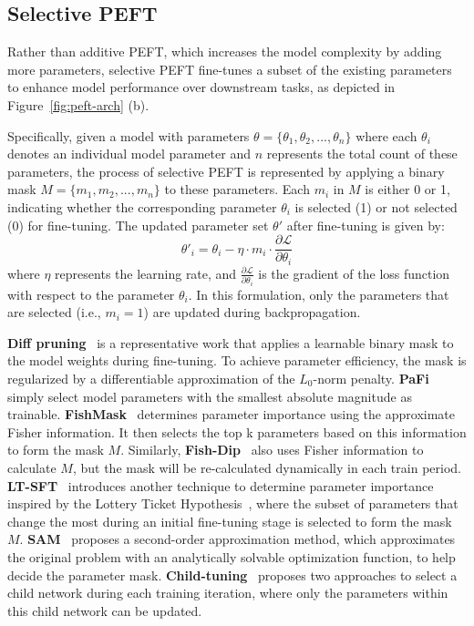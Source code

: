 \subsection{Selective PEFT}
\label{sec:selective}
Rather than additive PEFT, which increases the model complexity by adding more parameters, selective PEFT fine-tunes a subset of the existing parameters to enhance model performance over downstream tasks, as depicted in Figure~\ref{fig:peft-arch} (b).

Specifically, given a model with parameters \(\theta = \{\theta_1, \theta_2, ..., \theta_n\}\) where each \(\theta_i\) denotes an individual model parameter and $n$ represents the total count of these parameters, the process of selective PEFT is represented by applying a binary mask \(M = \{m_1, m_2, ..., m_n\}\) to these parameters. Each \(m_i\) in \(M\) is either 0 or 1, indicating whether the corresponding parameter \(\theta_i\) is selected (1) or not selected (0) for fine-tuning. The updated parameter set \(\theta'\) after fine-tuning is given by:
\begin{equation}
\theta'_i = \theta_i - \eta \cdot m_i \cdot \frac{\partial \mathcal{L}}{\partial \theta_i}
\end{equation}
where \(\eta\) represents the learning rate, and \(\frac{\partial \mathcal{L}}{\partial \theta_i}\) is the gradient of the loss function with respect to the parameter \(\theta_i\). In this formulation, only the parameters that are selected (i.e., \(m_i = 1\)) are updated during backpropagation. 



\textbf{Diff pruning}~\cite{10-diff-purning} is a representative work that applies a learnable binary mask to the model weights during fine-tuning. To achieve parameter efficiency, the mask is regularized by a differentiable approximation of the $L_0$-norm penalty. 
\textbf{PaFi}~\cite{liao2023parameter} simply select model parameters with the smallest absolute magnitude as trainable.
\textbf{FishMask}~\cite{36-fish-masks} determines parameter importance using the approximate Fisher information. It then selects the top k parameters based on this information to form the mask \(M\). Similarly, \textbf{Fish-Dip}~\cite{das2023unified} also uses Fisher information to calculate \(M\), but the mask will be re-calculated dynamically in each train period.
\textbf{LT-SFT}~\cite{ansell2021composable} introduces another technique to determine parameter importance inspired by the Lottery Ticket Hypothesis~\cite{frankle2018lottery,malach2020proving}, where the subset of parameters that change the most during an initial fine-tuning stage is selected to form the mask \(M\).
\textbf{SAM}~\cite{6-On-the-effectiveness-of-parameter-efficient-fine-tuning} proposes a second-order approximation method, which approximates the original problem with an analytically solvable optimization function, to help decide the parameter mask. 
\textbf{Child-tuning}~\cite{54-raise-child} proposes two approaches to select a child network during each training iteration, where only the parameters within this child network can be updated. 

